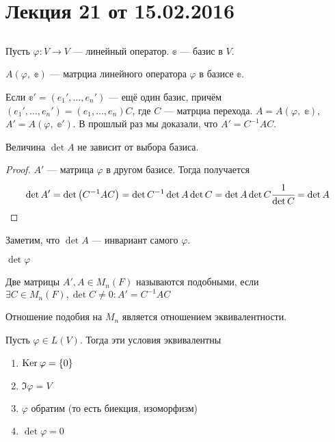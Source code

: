 ﻿


\renewcommand{\phi}{\varphi}

\section{Лекция 21 от 15.02.2016}
\subsection*{}
Пусть $\phi\colon V \rightarrow V$ --- линейный оператор. $\mathbb{e}$ --- базис в $V$. 
\begin{Designation}
    $A(\phi,\;\mathbb{e})$ --- матрциа линейного оператора $\phi$ в базисе $\mathbb{e}$.
\end{Designation}
Если $\mathbb{e}' = (e_1', \ldots, e_n')$ --- ещё один базис, причём $(e_1', \ldots, e_n') = (e_1, \ldots, e_n)C$, где $C$ --- матрциа перехода. $A = A(\phi,\; \mathbb{e})$, $A' = A(\phi,\; \mathbb{e}')$.
В прошлый раз мы доказали, что $A' = C^{-1}AC$.
\begin{Consequence}
    Величина $\det A$ не зависит от выбора базиса. 
\end{Consequence}
\begin{proof}
    $A'$ --- матрица $\phi$ в другом базисе. Тогда получается
    \begin{gather*}
        \det A' = \det \left(C^{-1}AC\right) = \det C^{-1} \det A \det C = \det A \det C \cfrac{1}{\det C} = \det A
    \end{gather*}
\end{proof}
Заметим, что $\det A$ --- инвариант самого $\phi$. 
\begin{Designation}
    $\det\phi$
\end{Designation}
\begin{Def}
    Две матрицы $A', A \in M_n(F)$ называются подобными, если $\exists C \in M_n(F), \det C \neq 0\colon A' = C^{-1}AC$
\end{Def}
\begin{Comment}
    Отношение подобия на $M_n$ является отношением эквивалентности. 
\end{Comment}
\begin{Suggestion}
    Пусть $\phi \in L(V)$. Тогда эти условия эквивалентны
    \begin{enumerate}
        \item $\Ker\phi = \{0\}$
        \item $\Im \phi = V$
        \item $\phi$ обратим (то есть биекция, изоморфизм)
        \item $\det \phi = 0$
    \end{enumerate}
\end{Suggestion}

